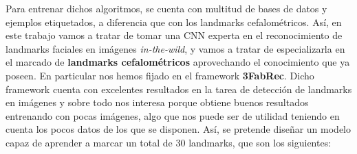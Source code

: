     \medskip
    
    \noindent Para entrenar dichos algoritmos, se cuenta con multitud de bases de datos y ejemplos etiquetados, a diferencia que con los landmarks cefalométricos. Así, en este trabajo vamos a tratar de tomar una CNN experta en el reconocimiento de landmarks faciales en imágenes \textit{in-the-wild}, y vamos a tratar de especializarla en el marcado de \textbf{landmarks cefalométricos} aprovechando el conocimiento que ya poseen. En particular nos hemos fijado en el framework \textbf{3FabRec}\cite{browatzki20203fabrec}. Dicho framework cuenta con excelentes resultados en la tarea de detección de landmarks en imágenes y sobre todo nos interesa porque obtiene buenos resultados entrenando con pocas imágenes, algo que nos puede ser de utilidad teniendo en cuenta los pocos datos de los que se disponen. Así, se pretende diseñar un modelo capaz de aprender a marcar un total de $30$ landmarks, que son los siguientes: 

